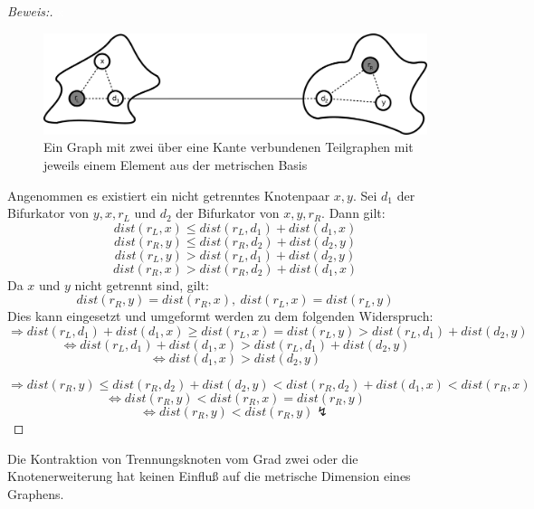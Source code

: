 \begin{proof}[Beweis:]
\textcolor{white}{x}
\begin{figure}[h!]
		\centering 		 
  \includegraphics[width=420pt]{bilder/bew5.pdf}
	\caption{Ein Graph mit zwei über eine Kante verbundenen Teilgraphen mit jeweils einem Element aus der metrischen Basis}
  	 \end{figure}
  Angenommen es existiert ein nicht getrenntes Knotenpaar $x,y$. Sei $d_1$ der Bifurkator von $y,x,r_L$ und $d_2$ der Bifurkator von $x,y,r_R$. Dann gilt: $$dist(r_L,x) \leq dist(r_L,d_1)+ dist(d_1,x)$$ $$dist(r_R,y) \leq dist(r_R,d_2)+ dist(d_2,y)$$ $$dist(r_L,y) > dist(r_L,d_1)+ dist(d_2,y)$$ $$dist(r_R,x) > dist(r_R,d_2)+ dist(d_1,x)$$
  Da $x$ und $y$ nicht getrennt sind, gilt:
   $$dist(r_R,y) =dist(r_R,x),\: dist(r_L,x) = dist(r_L,y)$$ Dies kann eingesetzt und umgeformt werden zu dem folgenden Widerspruch:
  $$\Rightarrow dist(r_L,d_1)+ dist(d_1,x) \geq dist(r_L,x) = dist(r_L,y)> dist(r_L,d_1)+ dist(d_2,y)$$
  $$\Leftrightarrow dist(r_L,d_1)+ dist(d_1,x) > dist(r_L,d_1)+ dist(d_2,y)$$
  $$\Leftrightarrow dist(d_1,x) >  dist(d_2,y)$$
  
  $$\Rightarrow dist(r_R,y) \leq dist(r_R,d_2)+ dist(d_2,y) < dist(r_R,d_2) + dist(d_1,x) < dist(r_R,x)$$
  $$\Leftrightarrow dist(r_R,y) < dist(r_R,x) = dist(r_R,y)$$
  $$\Leftrightarrow dist(r_R,y) < dist(r_R,y) \lightning $$  
  
\end{proof}
\begin{lem}
\label{lem2}
\label{sepvertex}
Die Kontraktion von Trennungsknoten vom Grad zwei oder die Knotenerweiterung hat keinen Einfluß auf die metrische Dimension eines Graphens.
\end{lem}
